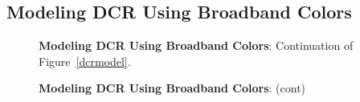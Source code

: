 \documentclass[DM,toc]{lsstdoc}
\begin{document}
\subsection{Modeling DCR Using Broadband Colors \label{appx:dcrmodel}}
\begin{figure}[h]
    \centering
    \caption[]{{\bf Modeling DCR Using Broadband Colors}: Continuation of Figure~\ref{dcrmodel}.}
    \label{dcrmodel2}
\end{figure}
\begin{figure}
    \ContinuedFloat
    \centering
    \caption[]{{\bf Modeling DCR Using Broadband Colors}: (cont)}
    \label{dcrmodel2}
\end{figure}
\end{document}
